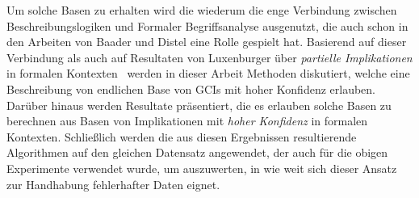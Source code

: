 \documentclass[ngerman,fleqn,DIV=14]{scrartcl}
\begin{document}
Um solche Basen zu erhalten wird die wiederum die enge Verbindung zwischen
Beschreibungslogiken und Formaler Begriffsanalyse ausgenutzt, die auch schon in den
Arbeiten von Baader und Distel eine Rolle gespielt hat.  Basierend auf dieser Verbindung
als auch auf Resultaten von Luxenburger über \emph{partielle Implikationen} in formalen
Kontexten~\cite{diss:Luxenburger} werden in dieser Arbeit Methoden diskutiert, welche eine
Beschreibung von endlichen Base von GCIs mit hoher Konfidenz erlauben.  Darüber hinaus
werden Resultate präsentiert, die es erlauben solche Basen zu berechnen aus Basen von
Implikationen mit \emph{hoher Konfidenz} in formalen Kontexten.  Schließlich werden die
aus diesen Ergebnissen resultierende Algorithmen auf den gleichen Datensatz angewendet,
der auch für die obigen Experimente verwendet wurde, um auszuwerten, in wie weit sich
dieser Ansatz zur Handhabung fehlerhafter Daten eignet.

%
%
%
%

\printbibliography{}
\end{document}
